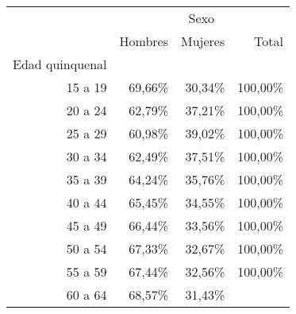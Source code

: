 \begin{tabular}{llll}
\cline{1-4}
\multicolumn{1}{c}{} &
  \multicolumn{3}{|c}{Sexo} \\
\multicolumn{1}{c}{} &
  \multicolumn{1}{|r}{Hombres} &
  \multicolumn{1}{r}{Mujeres} &
  \multicolumn{1}{r}{Total} \\
\cline{1-4}
\multicolumn{1}{r}{Edad quinquenal} &
  \multicolumn{1}{|r}{} &
  \multicolumn{1}{r}{} &
  \multicolumn{1}{r}{} \\
\multicolumn{1}{r}{15 a 19\hspace{1em}} &
  \multicolumn{1}{|r}{69,66\%} &
  \multicolumn{1}{r}{30,34\%} &
  \multicolumn{1}{r}{100,00\%} \\
\multicolumn{1}{r}{20 a 24\hspace{1em}} &
  \multicolumn{1}{|r}{62,79\%} &
  \multicolumn{1}{r}{37,21\%} &
  \multicolumn{1}{r}{100,00\%} \\
\multicolumn{1}{r}{25 a 29\hspace{1em}} &
  \multicolumn{1}{|r}{60,98\%} &
  \multicolumn{1}{r}{39,02\%} &
  \multicolumn{1}{r}{100,00\%} \\
\multicolumn{1}{r}{30 a 34\hspace{1em}} &
  \multicolumn{1}{|r}{62,49\%} &
  \multicolumn{1}{r}{37,51\%} &
  \multicolumn{1}{r}{100,00\%} \\
\multicolumn{1}{r}{35 a 39\hspace{1em}} &
  \multicolumn{1}{|r}{64,24\%} &
  \multicolumn{1}{r}{35,76\%} &
  \multicolumn{1}{r}{100,00\%} \\
\multicolumn{1}{r}{40 a 44\hspace{1em}} &
  \multicolumn{1}{|r}{65,45\%} &
  \multicolumn{1}{r}{34,55\%} &
  \multicolumn{1}{r}{100,00\%} \\
\multicolumn{1}{r}{45 a 49\hspace{1em}} &
  \multicolumn{1}{|r}{66,44\%} &
  \multicolumn{1}{r}{33,56\%} &
  \multicolumn{1}{r}{100,00\%} \\
\multicolumn{1}{r}{50 a 54\hspace{1em}} &
  \multicolumn{1}{|r}{67,33\%} &
  \multicolumn{1}{r}{32,67\%} &
  \multicolumn{1}{r}{100,00\%} \\
\multicolumn{1}{r}{55 a 59\hspace{1em}} &
  \multicolumn{1}{|r}{67,44\%} &
  \multicolumn{1}{r}{32,56\%} &
  \multicolumn{1}{r}{100,00\%} \\
\multicolumn{1}{r}{60 a 64\hspace{1em}} &
  \multicolumn{1}{|r}{68,57\%} &
  \multicolumn{1}{r}{31,43\%} &

\end{tabular}
